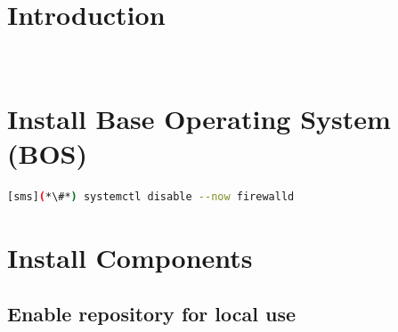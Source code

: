 \documentclass[letterpaper]{article}
\begin{document}
\graphicspath{{common/figures/}}
\thispagestyle{empty}




\newpage
\tableofcontents
\newpage


\section{Introduction} \label{sec:introduction}

 \\








\section{Install Base Operating System (BOS)}


\begin{lstlisting}[language=bash,keywords={}]
[sms](*\#*) systemctl disable --now firewalld
\end{lstlisting}


\section{Install \OHPC{} Components} \label{sec:basic_install}


\subsection{Enable \OHPC{} repository for local use} \label{sec:enable_repo}

\end{document}
